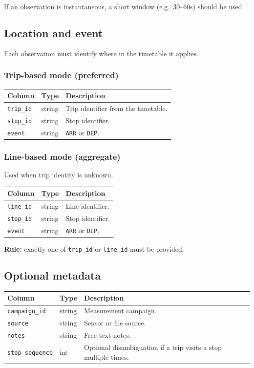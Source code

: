 \documentclass[11pt,a4paper]{article}
\begin{document}
If an observation is instantaneous, a short window (e.g.\ 30--60s) should be used.

\subsection{Location and event}

Each observation must identify where in the timetable it applies.

\subsubsection*{Trip-based mode (preferred)}

\begin{longtable}{p{4cm}p{3cm}p{8cm}}
\toprule
Column & Type & Description \\
\midrule
\texttt{trip\_id} & string & Trip identifier from the timetable. \\
\texttt{stop\_id} & string & Stop identifier. \\
\texttt{event} & string & \texttt{ARR} or \texttt{DEP}. \\
\bottomrule
\end{longtable}

\subsubsection*{Line-based mode (aggregate)}

Used when trip identity is unknown.

\begin{longtable}{p{4cm}p{3cm}p{8cm}}
\toprule
Column & Type & Description \\
\midrule
\texttt{line\_id} & string & Line identifier. \\
\texttt{stop\_id} & string & Stop identifier. \\
\texttt{event} & string & \texttt{ARR} or \texttt{DEP}. \\
\bottomrule
\end{longtable}

\textbf{Rule:} exactly one of \texttt{trip\_id} or \texttt{line\_id} must be provided.

\subsection{Optional metadata}

\begin{longtable}{p{4cm}p{3cm}p{8cm}}
\toprule
Column & Type & Description \\
\midrule
\texttt{campaign\_id} & string & Measurement campaign. \\
\texttt{source} & string & Sensor or file source. \\
\texttt{notes} & string & Free-text notes. \\
\texttt{stop\_sequence} & int & Optional disambiguation if a trip visits a stop multiple times. \\
\bottomrule
\end{longtable}
\end{document}
